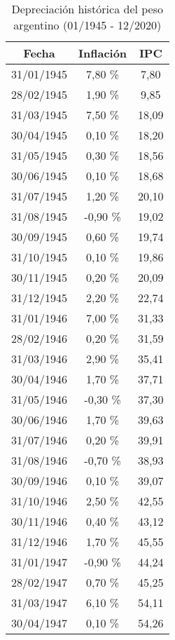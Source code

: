 \begin{center}
\begin{longtable}{|c|c|c|}
\caption{Depreciación histórica del peso argentino (01/1945 - 12/2020)}
\label{tab:depreciacion-peso} \\
\hline
\textbf{Fecha} & \textbf{Inflación} & \textbf{IPC} \\ \hline
31/01/1945 & 7,80 \% & 7,80  \\ \hline
28/02/1945 & 1,90 \% & 9,85  \\ \hline
31/03/1945 & 7,50 \% & 18,09  \\ \hline
30/04/1945 & 0,10 \% & 18,20  \\ \hline
31/05/1945 & 0,30 \% & 18,56  \\ \hline
30/06/1945 & 0,10 \% & 18,68  \\ \hline
31/07/1945 & 1,20 \% & 20,10  \\ \hline
31/08/1945 & -0,90 \% & 19,02  \\ \hline
30/09/1945 & 0,60 \% & 19,74  \\ \hline
31/10/1945 & 0,10 \% & 19,86  \\ \hline
30/11/1945 & 0,20 \% & 20,09  \\ \hline
31/12/1945 & 2,20 \% & 22,74  \\ \hline
31/01/1946 & 7,00 \% & 31,33  \\ \hline
28/02/1946 & 0,20 \% & 31,59  \\ \hline
31/03/1946 & 2,90 \% & 35,41  \\ \hline
30/04/1946 & 1,70 \% & 37,71  \\ \hline
31/05/1946 & -0,30 \% & 37,30  \\ \hline
30/06/1946 & 1,70 \% & 39,63  \\ \hline
31/07/1946 & 0,20 \% & 39,91  \\ \hline
31/08/1946 & -0,70 \% & 38,93  \\ \hline
30/09/1946 & 0,10 \% & 39,07  \\ \hline
31/10/1946 & 2,50 \% & 42,55  \\ \hline
30/11/1946 & 0,40 \% & 43,12  \\ \hline
31/12/1946 & 1,70 \% & 45,55  \\ \hline
31/01/1947 & -0,90 \% & 44,24  \\ \hline
28/02/1947 & 0,70 \% & 45,25  \\ \hline
31/03/1947 & 6,10 \% & 54,11  \\ \hline
30/04/1947 & 0,10 \% & 54,26  \\ \hline

\end{longtable}
\end{center}
